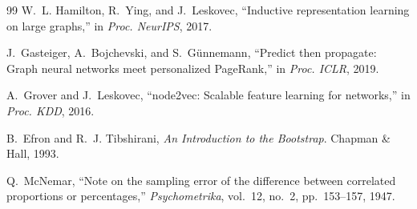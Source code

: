 \documentclass[conference]{IEEEtran}
\begin{document}
\begin{thebibliography}{99}
W.~L. Hamilton, R.~Ying, and J.~Leskovec, ``Inductive representation learning on large graphs,'' in \emph{Proc. NeurIPS}, 2017.

J.~Gasteiger, A.~Bojchevski, and S.~G\"unnemann, ``Predict then propagate: Graph neural networks meet personalized PageRank,'' in \emph{Proc. ICLR}, 2019.

A.~Grover and J.~Leskovec, ``node2vec: Scalable feature learning for networks,'' in \emph{Proc. KDD}, 2016.

B.~Efron and R.~J. Tibshirani, \emph{An Introduction to the Bootstrap}. Chapman \& Hall, 1993.

Q.~McNemar, ``Note on the sampling error of the difference between correlated proportions or percentages,'' \emph{Psychometrika}, vol.~12, no.~2, pp.~153--157, 1947.

\end{thebibliography}
\end{document}
